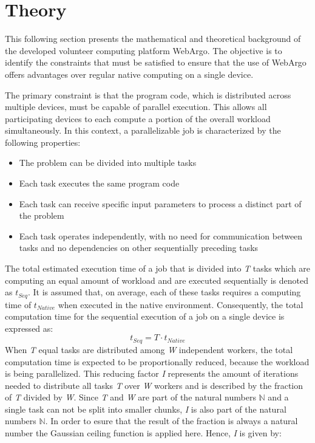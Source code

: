 \section{Theory}
\label{sec:concept:theory}
This following section presents the mathematical and theoretical background of the developed volunteer computing platform WebArgo. The objective is to identify the constraints that must be satisfied to ensure that the use of WebArgo offers advantages over regular native computing on a single device.

The primary constraint is that the program code, which is distributed across multiple devices, must be capable of parallel execution. This allows all participating devices to each compute a portion of the overall workload simultaneously. In this context, a parallelizable job is characterized by the following properties:
\begin{itemize}
  \item The problem can be divided into multiple tasks
  \item Each task executes the same program code
  \item Each task can receive specific input parameters to process a distinct part of the problem
  \item Each task operates independently, with no need for communication between tasks and no dependencies on other sequentially preceding tasks
\end{itemize}
The total estimated execution time of a job that is divided into \emph{T} tasks which are computing an equal amount of workload and are executed sequentially is denoted as $t_{Seq}$. It is assumed that, on average, each of these tasks requires a computing time of $t_{Native}$ when executed in the native environment. Consequently, the total computation time for the sequential execution of a job on a single device is expressed as:
\begin{equation}
  t_{Seq} = T \cdot t_{Native}
  \label{equ:single}
\end{equation}
When \emph{T} equal tasks are distributed among \emph{W} independent workers, the total computation time is expected to be proportionally reduced, because the workload is being parallelized. This reducing factor \emph{I} represents the amount of iterations needed to distribute all tasks \emph{T} over \emph{W} workers and is described by the fraction of \emph{T} divided by \emph{W}. Since \emph{T} and \emph{W} are part of the natural numbers $\mathbb{N}$ and a single task can not be split into smaller chunks, \emph{I} is also part of the natural numbers $\mathbb{N}$. In order to esure that the result of the fraction is always a natural number the Gaussian ceiling function is applied here. Hence, \emph{I} is given by: 
